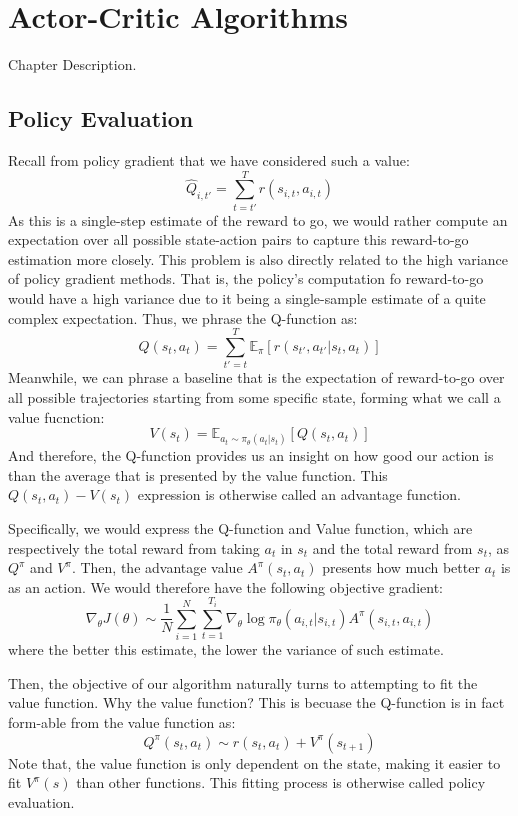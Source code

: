 \chapter{Actor-Critic Algorithms}
Chapter Description.

\section{Policy Evaluation}
Recall from policy gradient that we have considered such a value:
\[
    \hat{Q}_{i, t'} = \sum_{t=t'}^T r(s_{i,t}, a_{i,t})
\]
As this is a single-step estimate of the reward to go, we would rather compute an expectation over all possible state-action pairs to capture this reward-to-go estimation more closely.
This problem is also directly related to the high variance of policy gradient methods. That is, the policy's computation fo reward-to-go would have a high variance due to it being a single-sample estimate of a quite complex expectation.
Thus, we phrase the Q-function as:
\[
    Q(s_t, a_t) = \sum_{t'=t}^T \mathbb{E}_{\pi} \left[ r(s_{t'}, a_{t'} | s_t, a_t) \right]
\]
Meanwhile, we can phrase a baseline that is the expectation of reward-to-go over all possible trajectories starting from some specific state, forming what we call a value fucnction:
\[
    V(s_t) = \mathbb{E}_{a_t \sim \pi_\theta(a_t | s_t)} [Q(s_t, a_t)]
\]
And therefore, the Q-function provides us an insight on how good our action is than the average that is presented by the value function.
This $Q(s_t, a_t) - V(s_t)$ expression is otherwise called an advantage function.

Specifically, we would express the Q-function and Value function, which are respectively the total reward from taking $a_t$ in $s_t$ and the total reward from $s_t$, as $Q^\pi$ and $V^\pi$.
Then, the advantage value $A^\pi(s_t, a_t)$ presents how much better $a_t$ is as an action.
We would therefore have the following objective gradient:
\[
    \nabla_\theta J(\theta) \sim \frac{1}{N} \sum_{i=1}^N \sum_{t=1}^{T_i} \nabla_\theta \log \pi_\theta(a_{i,t} | s_{i,t}) A^\pi(s_{i,t}, a_{i,t})
\]
where the better this estimate, the lower the variance of such estimate.

Then, the objective of our algorithm naturally turns to attempting to fit the value function.
Why the value function? This is becuase the Q-function is in fact form-able from the value function as:
\[
    Q^\pi(s_t, a_t) \sim r(s_t, a_t) + V^\pi (s_{t+1})
\]
Note that, the value function is only dependent on the state, making it easier to fit $V^\pi (s)$ than other functions.
This fitting process is otherwise called policy evaluation.

